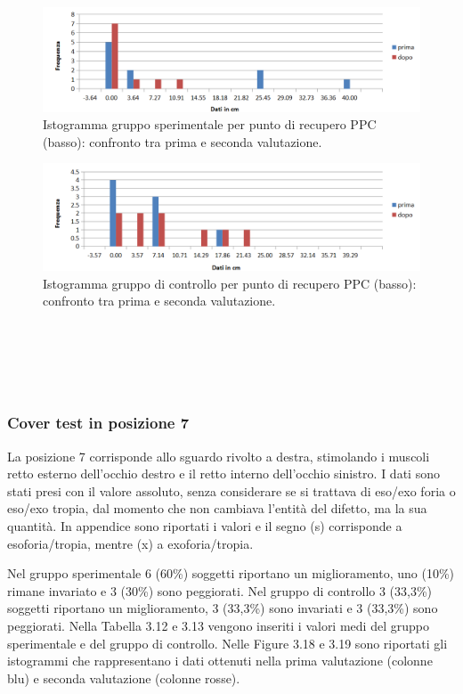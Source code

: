  \begin{figure}[h!]
	\centering
	\includegraphics[scale=0.38]{source/grafici/Grafico_recupero_PPC_basso_trattati.png}
	\caption[Istogramma gruppo sperimentale per punto di recupero PPC (basso)]{Istogramma gruppo sperimentale per punto di recupero PPC (basso): confronto tra prima e seconda valutazione.}
	\label{fig:issuexample}
\end{figure}
 \begin{figure}[h!]
	\centering
	\includegraphics[scale=0.38]{source/grafici/Grafico_recupero_PPC_basso_NON_trattati.png}
	\caption[Istogramma gruppo di controllo per punto di recupero PPC (basso)]{Istogramma gruppo di controllo per punto di recupero PPC (basso): confronto tra prima e seconda valutazione.}
	\label{fig:issuexample}
\end{figure}
\\\ \\\  \\\
\subsubsection{Cover test in posizione 7}

La posizione 7 corrisponde allo sguardo rivolto a destra, stimolando i muscoli retto esterno dell’occhio destro e il retto interno dell’occhio sinistro. I dati sono stati presi con il valore assoluto, senza considerare se si trattava di eso/exo foria o eso/exo tropia, dal momento che non cambiava l’entità del difetto, ma la sua quantità. In appendice sono riportati i valori e il segno (s) corrisponde a esoforia/tropia, mentre (x) a exoforia/tropia. 

Nel gruppo sperimentale 6 (60\%) soggetti riportano un miglioramento, uno (10\%) rimane invariato e 3 (30\%) sono peggiorati. Nel gruppo di controllo 3 (33,3\%) soggetti riportano un miglioramento, 3 (33,3\%) sono invariati e 3 (33,3\%) sono peggiorati. Nella Tabella 3.12 e 3.13 vengono inseriti i valori medi del gruppo sperimentale e del gruppo di controllo. Nelle Figure 3.18 e 3.19 sono riportati gli istogrammi che rappresentano i dati ottenuti nella prima valutazione (colonne blu) e seconda valutazione (colonne rosse).

